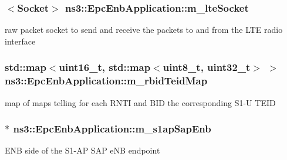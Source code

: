 \subsubsection[{\texorpdfstring{m\+\_\+lte\+Socket}{m_lteSocket}}]{$<${\bf Socket}$>$ ns3\+::\+Epc\+Enb\+Application\+::m\+\_\+lte\+Socket\hspace{0.3cm}{\ttfamily [private]}}\hypertarget{classns3_1_1EpcEnbApplication_a510a8ee52d8499fa9e1f54b26486a80f}{}\label{classns3_1_1EpcEnbApplication_a510a8ee52d8499fa9e1f54b26486a80f}
raw packet socket to send and receive the packets to and from the L\+TE radio interface 
\subsubsection[{\texorpdfstring{m\+\_\+rbid\+Teid\+Map}{m_rbidTeidMap}}]{\setlength{\rightskip}{0pt plus 5cm}std\+::map$<$uint16\+\_\+t, std\+::map$<$uint8\+\_\+t, uint32\+\_\+t$>$ $>$ ns3\+::\+Epc\+Enb\+Application\+::m\+\_\+rbid\+Teid\+Map\hspace{0.3cm}{\ttfamily [private]}}\hypertarget{classns3_1_1EpcEnbApplication_a06ad312a7c59dd349c44bbdecf3c7358}{}\label{classns3_1_1EpcEnbApplication_a06ad312a7c59dd349c44bbdecf3c7358}
map of maps telling for each R\+N\+TI and B\+ID the corresponding S1-\/U T\+E\+ID 
\subsubsection[{\texorpdfstring{m\+\_\+s1ap\+Sap\+Enb}{m_s1apSapEnb}}]{$\ast$ ns3\+::\+Epc\+Enb\+Application\+::m\+\_\+s1ap\+Sap\+Enb\hspace{0.3cm}{\ttfamily [private]}}\hypertarget{classns3_1_1EpcEnbApplication_a08723a377d93a90f768f48a7a6386e19}{}\label{classns3_1_1EpcEnbApplication_a08723a377d93a90f768f48a7a6386e19}
E\+NB side of the S1-\/\+AP S\+AP e\+NB endpoint 
